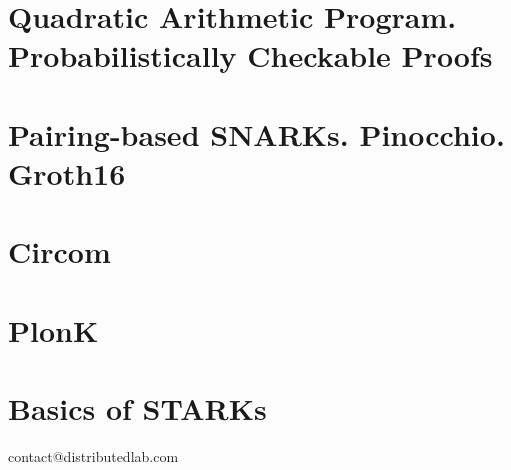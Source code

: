 \documentclass{zkdl-template}
\begin{document}
    \section[Quadratic Arithmetic Program]{Quadratic Arithmetic Program. Probabilistically Checkable Proofs}\label{section:qap-pcp}
    

    \section[Pairing-based SNARKs]{Pairing-based SNARKs. Pinocchio. Groth16}\label{section:groth}
    

    \section{Circom}\label{section:circom}
    

    \section{PlonK}\label{section:plonk}
    

    \section{Basics of STARKs}\label{section:stark}
    


    \newpage
    \pagestyle{empty}

    \ifodd\value{page}
        \newpage
    \fi

    \vspace*{\fill}

    \begin{center}
        contact@distributedlab.com
    \end{center}

    \vspace*{\fill}
\end{document}
